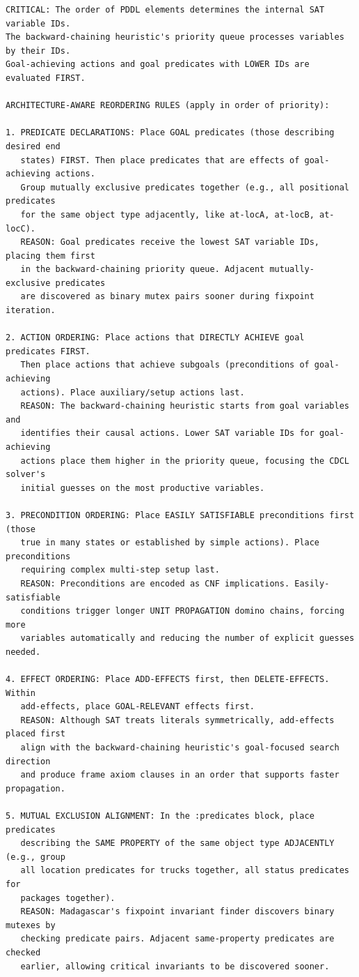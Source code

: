 \documentclass[
  numbers=noenddot,
  english,  %
  a4paper,  %
  oneside,  %
  bibliography=totoc,
  headsepline,
  cleardoublepage=empty,
  parskip=half,
  draft=false
]{scrbook}
\theoremstyle{break}
\begin{document}
\begin{lstlisting}[language={}, caption={Architecture-aware prompt for Madagascar (MpC).}, label={lst:prompt:madagascar}, basicstyle=\small\ttfamily, numbers=none, frame=single, breaklines=true]
CRITICAL: The order of PDDL elements determines the internal SAT variable IDs.
The backward-chaining heuristic's priority queue processes variables by their IDs.
Goal-achieving actions and goal predicates with LOWER IDs are evaluated FIRST.

ARCHITECTURE-AWARE REORDERING RULES (apply in order of priority):

1. PREDICATE DECLARATIONS: Place GOAL predicates (those describing desired end
   states) FIRST. Then place predicates that are effects of goal-achieving actions.
   Group mutually exclusive predicates together (e.g., all positional predicates
   for the same object type adjacently, like at-locA, at-locB, at-locC).
   REASON: Goal predicates receive the lowest SAT variable IDs, placing them first
   in the backward-chaining priority queue. Adjacent mutually-exclusive predicates
   are discovered as binary mutex pairs sooner during fixpoint iteration.

2. ACTION ORDERING: Place actions that DIRECTLY ACHIEVE goal predicates FIRST.
   Then place actions that achieve subgoals (preconditions of goal-achieving
   actions). Place auxiliary/setup actions last.
   REASON: The backward-chaining heuristic starts from goal variables and
   identifies their causal actions. Lower SAT variable IDs for goal-achieving
   actions place them higher in the priority queue, focusing the CDCL solver's
   initial guesses on the most productive variables.

3. PRECONDITION ORDERING: Place EASILY SATISFIABLE preconditions first (those
   true in many states or established by simple actions). Place preconditions
   requiring complex multi-step setup last.
   REASON: Preconditions are encoded as CNF implications. Easily-satisfiable
   conditions trigger longer UNIT PROPAGATION domino chains, forcing more
   variables automatically and reducing the number of explicit guesses needed.

4. EFFECT ORDERING: Place ADD-EFFECTS first, then DELETE-EFFECTS. Within
   add-effects, place GOAL-RELEVANT effects first.
   REASON: Although SAT treats literals symmetrically, add-effects placed first
   align with the backward-chaining heuristic's goal-focused search direction
   and produce frame axiom clauses in an order that supports faster propagation.

5. MUTUAL EXCLUSION ALIGNMENT: In the :predicates block, place predicates
   describing the SAME PROPERTY of the same object type ADJACENTLY (e.g., group
   all location predicates for trucks together, all status predicates for
   packages together).
   REASON: Madagascar's fixpoint invariant finder discovers binary mutexes by
   checking predicate pairs. Adjacent same-property predicates are checked
   earlier, allowing critical invariants to be discovered sooner.


\end{lstlisting}
\end{document}
